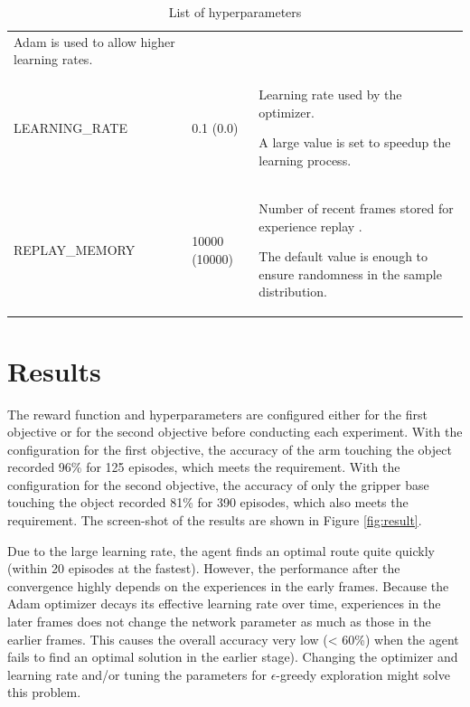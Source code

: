 \documentclass[a4paper]{article}
\begin{document}
\begin{table}[htp]
\begin{tabular}{p{3.5cm}|p{1.5cm}|p{8.5cm}}
Adam \cite{DBLP:journals/corr/KingmaB14} is used to allow higher learning rates. \\
LEARNING\_RATE & 0.1 (0.0) & Learning rate used by the optimizer.

A large value is set to speedup the learning process. \\
REPLAY\_MEMORY & 10000 (10000) & Number of recent frames stored for experience replay \cite{Zhan2016}.

The default value is enough to ensure randomness in the sample distribution. \\
\end{tabular}
\caption{List of hyperparameters}
\label{tab:hyperparameters}
\end{table}

\section{Results}
The reward function and hyperparameters are configured either for the first objective or for the second objective before conducting each experiment. With the configuration for the first objective, the accuracy of the arm touching the object recorded 96\% for 125 episodes, which meets the requirement. With the configuration for the second objective, the accuracy of only the gripper base touching the object recorded 81\% for 390 episodes, which also meets the requirement. The screen-shot of the results are shown in Figure \ref{fig:result}.

Due to the large learning rate, the agent finds an optimal route quite quickly (within 20 episodes at the fastest). However, the performance after the convergence highly depends on the experiences in the early frames. Because the Adam optimizer decays its effective learning rate over time, experiences in the later frames does not change the network parameter as much as those in the earlier frames. This causes the overall accuracy very low (< 60\%) when the agent fails to find an optimal solution in the earlier stage). Changing the optimizer and learning rate and/or tuning the parameters for \(\epsilon\)-greedy exploration might solve this problem.
\end{document}
